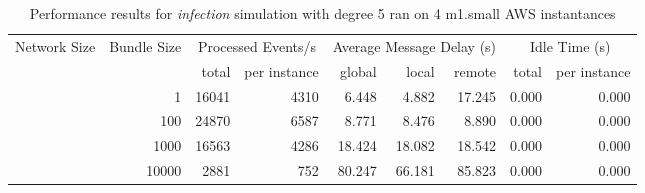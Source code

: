 \begin{table}
	  \caption[Performance results, \emph{infection:5 on 4 m1.small instances }]{ Performance results for \emph{ infection } simulation with degree 5 ran on 4 m1.small AWS instantances }
	\begin{tabular}{rrrrrrrrr}
	\hline\noalign{\smallskip}

	Network Size &
	Bundle Size &
	\multicolumn{2}{c}{Processed Events/s} & 
	\multicolumn{3}{c}{Average Message Delay (s)} & 
	\multicolumn{2}{c}{Idle Time (s)}  \\

	 & 
	 & 
	 total & per instance
     & global & local & remote
     & total & per instance\\

			
				\noalign{\smallskip}\hline
				\multirow{ 4 }{*}{ 40000 } &
				
					
					 
					\multirow{ 1 }{*}{ 1 } &
					
						
							    
							     16041  & 4310  
	                           & 6.448 & 4.882 & 17.245
	                           & 0.000 & 0.000  \\
	                
	            
					 &  
					 
					\multirow{ 1 }{*}{ 100 } &
					
						
							    
							     24870  & 6587  
	                           & 8.771 & 8.476 & 8.890
	                           & 0.000 & 0.000  \\
	                
	            
					 &  
					 
					\multirow{ 1 }{*}{ 1000 } &
					
						
							    
							     16563  & 4286  
	                           & 18.424 & 18.082 & 18.542
	                           & 0.000 & 0.000  \\
	                
	            
					 &  
					 
					\multirow{ 1 }{*}{ 10000 } &
					
						
							    
							     2881  & 752  
	                           & 80.247 & 66.181 & 85.823
	                           & 0.000 & 0.000  \\
	                

\end{tabular}
\end{table}
